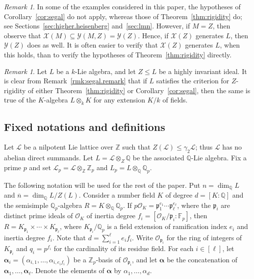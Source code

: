 \documentclass[11pt,a4paper]{amsart}
\theoremstyle{plain}
\theoremstyle{remark}
\newtheorem{rem}[thm]{Remark}
\newcommand{\Z}{\mathbb{Z}}
\newcommand{\Q}{\mathbb{Q}}
\newcommand{\tensor}{\otimes}
\newcommand{\p}{\mathfrak{p}}
\newcommand{\npr}{\ell}
\newcommand{\dimL}{n}
\newcommand{\overdim}{\overline{n}}
\def \p {\ensuremath{\mathfrak{p}}}
\begin{document}
\begin{rem} \label{rem:segal}
In some of the examples considered in this paper, the hypotheses of Corollary~\ref{cor:segal} do not apply, whereas those of Theorem~\ref{thm:rigidity} do; see Sections~\ref{sec:higher.heisenberg} and~\ref{sec:lmn}.  However, if $M = Z$, then observe that $\mathcal{X}(M) \subseteq \mathcal{Y}(M,Z) = \mathcal{Y}(Z)$.  Hence, if $\mathcal{X}(Z)$ generates $L$, then $\mathcal{Y}(Z)$ does as well.  It is often easier to verify that $\mathcal{X}(Z)$ generates $L$, when this holds, than to verify the hypotheses of Theorem~\ref{thm:rigidity} directly.
\end{rem}

\begin{rem} \label{rem:extensions}
Let $L$ be a $k$-Lie algebra, and let $Z \leq L$ be a highly invariant ideal.  It is clear from Remark~\ref{rmk:segal.remark} that if $L$ satisfies the criterion for $Z$-rigidity of either Theorem~\ref{thm:rigidity} or Corollary~\ref{cor:segal}, then the same is true of the $K$-algebra $L \tensor_k K$ for any extension $K/k$ of fields.
\end{rem}

\subsection{Fixed notations and definitions} \label{sec:consequences}
Let $\mathcal{L}$ be a nilpotent Lie lattice over $\Z$ such that $Z(\mathcal{L}) \leq \gamma_2 \mathcal{L}$; thus $\mathcal{L}$ has no abelian direct summands.  Let $L = \mathcal{L} \tensor_Z \Q$ be the associated $\Q$-Lie algebra.  Fix a prime $p$ and set $\mathcal{L}_p = \mathcal{L} \tensor_\Z  \Z_p$ and $L_p = L \tensor_\Q \Q_p$.  


The following notation will be used for the rest of the paper.  Put $\dimL = \dim_{\Q} L$ and $\overdim = \dim_\Q L / Z(L)$.  
Consider a number field $K$ of degree $d = [K:\Q]$ and the semisimple $\Q_p$-algebra $R = K \tensor_{\Q} \Q_p$.  If $p \mathcal{O}_K = \mathfrak{p}_1^{e_1} \cdots \mathfrak{p}_\npr^{e_\npr}$, where the $\mathfrak{p}_i$ are distinct prime ideals of $\mathcal{O}_K$ of inertia degree $f_i = [\mathcal{O}_K / \mathfrak{p}_i : \mathbb{F}_p]$, then $R = K_{\p_1} \times \cdots \times K_{\p_\npr}$, where $K_{\p_i} / \Q_p$ is a field extension of ramification index $e_i$ and inertia degree $f_i$.  Note that $d = \sum_{i = 1}^\npr e_i f_i$.  Write $\mathcal{O}_{\p_i}$ for the ring of integers of $K_{\p_i}$ and $q_i = p^{f_i}$ for the cardinality of its residue field.  
For each $i \in [\npr]$, let $\boldsymbol{\alpha}_i = (\alpha_{i,1}, \dots, \alpha_{i, e_i f_i})$ be a $\Z_p$-basis of $\mathcal{O}_{\p_i}$, and let $\boldsymbol{\alpha}$ be the concatenation of $\boldsymbol{\alpha}_1, \dots, \boldsymbol{\alpha}_\npr$.  Denote the elements of $\boldsymbol{\alpha}$ by $\alpha_1, \dots, \alpha_d$.
\end{document}
